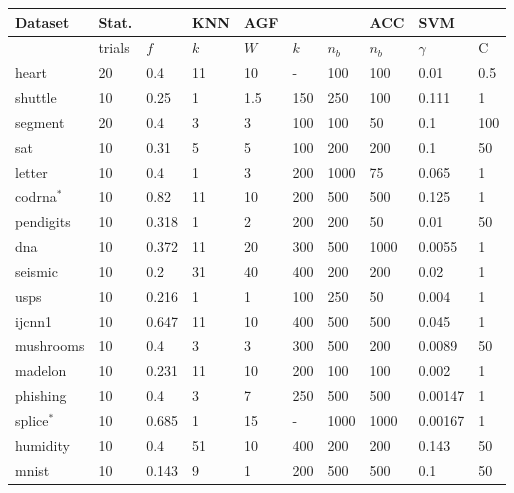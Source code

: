 
\begin{tabular}{|l||ll|l|lll|l|ll|}
	\hline
Dataset	& Stat. & & KNN & AGF & & & ACC & SVM & \\\hline
 & trials & $f$ & $k$ & $W$ & $k$ & $n_b$ & $n_b$ & $\gamma$ & C\\\hline\hline
	heart & 20 & 0.4 & 11 & 10 & - & 100 & 100 & 0.01 & 0.5 \\
	shuttle & 10 & 0.25 & 1 & 1.5 & 150 & 250 & 100 & 0.111 & 1 \\
	segment & 20 & 0.4 & 3 & 3 & 100 & 100 & 50 & 0.1 & 100 \\
	sat & 10 & 0.31 & 5 & 5 & 100 & 200 & 200 & 0.1 & 50\\
	letter & 10 & 0.4 & 1 & 3 & 200 & 1000 & 75 & 0.065 & 1 \\
	codrna$^*$ & 10 & 0.82 & 11 & 10 & 200 & 500 & 500 & 0.125 & 1 \\
	pendigits & 10 & 0.318 & 1 & 2 & 200 & 200 & 50 & 0.01 & 50 \\
	dna & 10 & 0.372 & 11 & 20 & 300 & 500 & 1000 & 0.0055 & 1 \\
	seismic & 10 & 0.2 & 31 & 40 & 400 & 200 & 200 & 0.02 & 1 \\
	usps & 10 & 0.216 & 1 & 1 & 100 & 250 & 50 & 0.004 & 1 \\
	ijcnn1 & 10 & 0.647 & 11 & 10 & 400 & 500 & 500 & 0.045 & 1 \\
	mushrooms & 10 & 0.4 & 3 & 3 & 300 & 500 & 200 & 0.0089 & 50 \\
	madelon & 10 & 0.231 & 11 & 10 & 200 & 100 & 100 & 0.002 & 1 \\
	phishing & 10 & 0.4 & 3 & 7 & 250 & 500 & 500 & 0.00147 & 1 \\
	splice$^*$ & 10 & 0.685 & 1 & 15 & - & 1000 & 1000 & 0.00167 & 1 \\
	humidity & 10 & 0.4 & 51 & 10 & 400 & 200 & 200 & 0.143 & 50 \\
	mnist & 10 & 0.143 & 9 & 1 & 200 & 500 & 500 & 0.1 & 50 \\
	\hline
\end{tabular}

